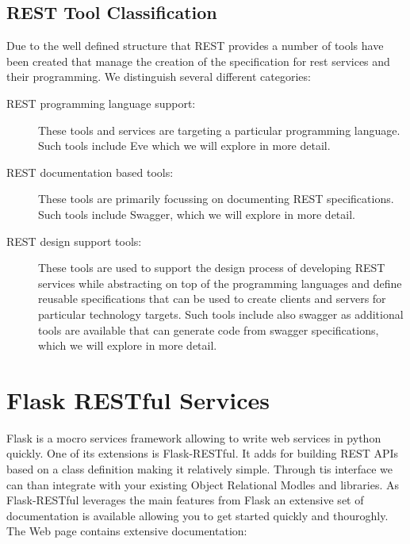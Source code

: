  
\subsection{REST Tool Classification}

Due to the well defined structure that REST provides a number of tools
have been created that manage the creation of the specification for
rest services and their programming. We distinguish several different
categories:

\begin{description}
\item[REST programming language support:] These tools and services are
targeting a particular programming language. Such tools include Eve
which we will explore in more detail.

\item[REST documentation based tools:] These tools are primarily
  focussing on documenting REST specifications. Such tools include
  Swagger, which we will explore in more detail.

\item[REST design support tools:] These tools are used to support the
  design process of developing REST services while abstracting on top
  of the programming languages and define reusable specifications that
  can be used to create clients and servers for particular technology
  targets. Such tools include also swagger as additional tools are
  available that can generate code from swagger specifications, which
  we will explore in more detail.
\end{description}


\section{Flask RESTful Services}


Flask is a mocro services framework allowing to write web services in
python quickly. One of its extensions is Flask-RESTful. It adds for 
building REST APIs based on a class definition making it relatively
simple. Through tis interface we can than integrate with
your existing Object Relational Modles and libraries. As Flask-RESTful
leverages the main features from Flask an extensive set of
documentation is available allowing you to get started quickly and
thouroghly. The Web page contains extensive documentation:


